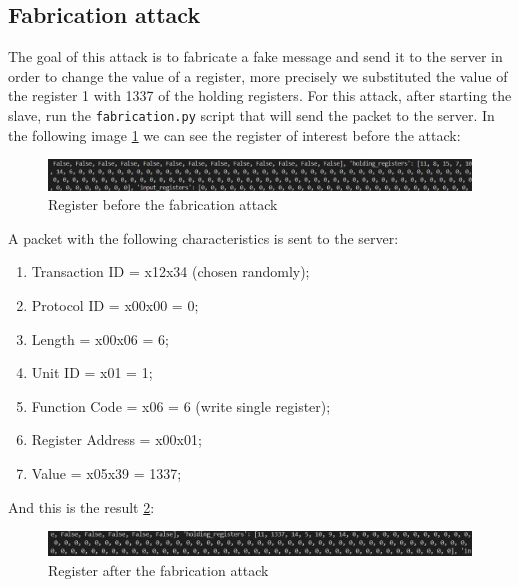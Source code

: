 \documentclass[12pt]{article}
\begin{document}
\subsection{Fabrication attack}
The goal of this attack is to fabricate a fake message and send it to the server in order to change the value 
of a register, more precisely we substituted the value of the register 1 with 1337 of the holding registers.
For this attack, after starting the slave, run the \texttt{fabrication.py} script that will send the packet to the server.
In the following image \ref{fig:beforeFabrication} we can see the register of interest before the attack:
\begin{figure}[h]
    \centering
    \includegraphics[width=1\textwidth]{images/BeforeFabrication.png}
    \caption{Register before the fabrication attack}
    \label{fig:beforeFabrication}
\end{figure}
A packet with the following characteristics is sent to the server:
\begin{enumerate}
    \item Transaction ID = x12x34 (chosen randomly);
    \item Protocol ID = x00x00 = 0;
    \item Length = x00x06 = 6;
    \item Unit ID = x01 = 1;
    \item Function Code = x06 = 6 (write single register);
    \item Register Address = x00x01;
    \item Value = x05x39 = 1337;
\end{enumerate}
And this is the result \ref{fig:afterFabrication}:
\begin{figure}[h]
    \centering
    \includegraphics[width=1\textwidth]{images/AfterFabrication.png}
    \caption{Register after the fabrication attack}
    \label{fig:afterFabrication}
\end{figure}
\end{document}
